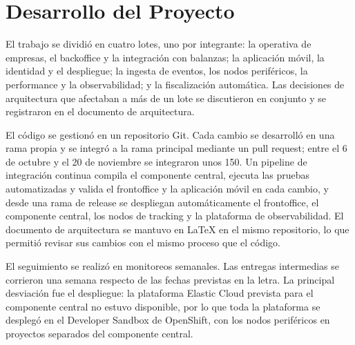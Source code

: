 \section{Desarrollo del Proyecto}
El trabajo se dividió en cuatro lotes, uno por integrante: la operativa de empresas, el backoffice y la integración con balanzas; la aplicación móvil, la identidad y el despliegue; la ingesta de eventos, los nodos periféricos, la performance y la observabilidad; y la fiscalización automática. Las decisiones de arquitectura que afectaban a más de un lote se discutieron en conjunto y se registraron en el documento de arquitectura.

El código se gestionó en un repositorio Git. Cada cambio se desarrolló en una rama propia y se integró a la rama principal mediante un pull request; entre el 6 de octubre y el 20 de noviembre se integraron unos 150. Un pipeline de integración continua compila el componente central, ejecuta las pruebas automatizadas y valida el frontoffice y la aplicación móvil en cada cambio, y desde una rama de release se despliegan automáticamente el frontoffice, el componente central, los nodos de tracking y la plataforma de observabilidad. El documento de arquitectura se mantuvo en LaTeX en el mismo repositorio, lo que permitió revisar sus cambios con el mismo proceso que el código.

El seguimiento se realizó en monitoreos semanales. Las entregas intermedias se corrieron una semana respecto de las fechas previstas en la letra. La principal desviación fue el despliegue: la plataforma Elastic Cloud prevista para el componente central no estuvo disponible, por lo que toda la plataforma se desplegó en el Developer Sandbox de OpenShift, con los nodos periféricos en proyectos separados del componente central.
